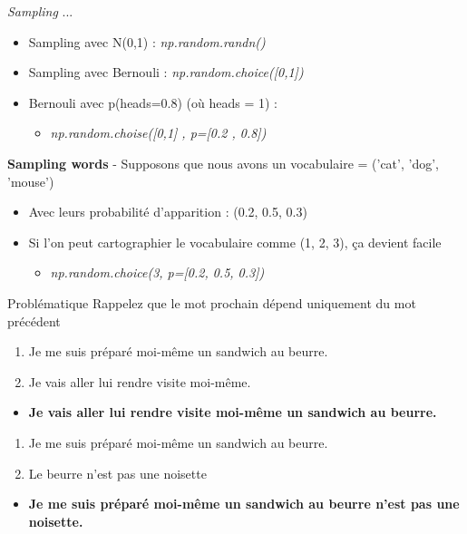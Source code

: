 \documentclass[aspectratio=169,xcolor=dvipsnames, t]{beamer}
\begin{document}
\begin{frame}{\textit{Sampling} ... }
	\begin{itemize}
		\item Sampling avec N(0,1) : \textit{np.random.randn()}
		\item Sampling avec Bernouli : \textit{np.random.choice([0,1])}
		\item Bernouli avec p(heads=0.8) (où heads = 1) :
		\begin{itemize}
			\item \textit{np.random.choise([0,1] , p=[0.2 , 0.8])}
		\end{itemize} 
	\end{itemize}
	\vspace{0.5cm}
	\textbf{Sampling words} - Supposons que nous avons un vocabulaire = ('cat', 'dog', 'mouse')
	\begin{itemize}
		\item Avec leurs probabilité d'apparition : (0.2, 0.5, 0.3)
		\item Si l'on peut cartographier le vocabulaire  comme (1, 2, 3), ça devient facile
		\begin{itemize}
			\item \textit{np.random.choice(3, p=[0.2, 0.5, 0.3])}
		\end{itemize}
		
	\end{itemize}		
\end{frame}


\begin{frame}{Problématique}
	Rappelez que le mot prochain dépend uniquement du mot précédent
	\begin{examples}
		\begin{enumerate}
			\item Je me suis préparé moi-même un sandwich au beurre.
			\item Je vais aller lui rendre visite moi-même.
		\end{enumerate}
		\begin{itemize}
			\item \textbf{ Je vais aller lui rendre visite moi-même un sandwich au beurre.}
		\end{itemize}
	\end{examples}

	\begin{examples}
		\begin{enumerate}
			\item Je me suis préparé moi-même un sandwich au beurre.
			\item Le beurre n'est pas une noisette
		\end{enumerate}
		\begin{itemize}
			\item \textbf{ Je me suis préparé moi-même un sandwich au beurre n'est pas une noisette.}
		\end{itemize}
	\end{examples}
\end{frame}
\end{document}
